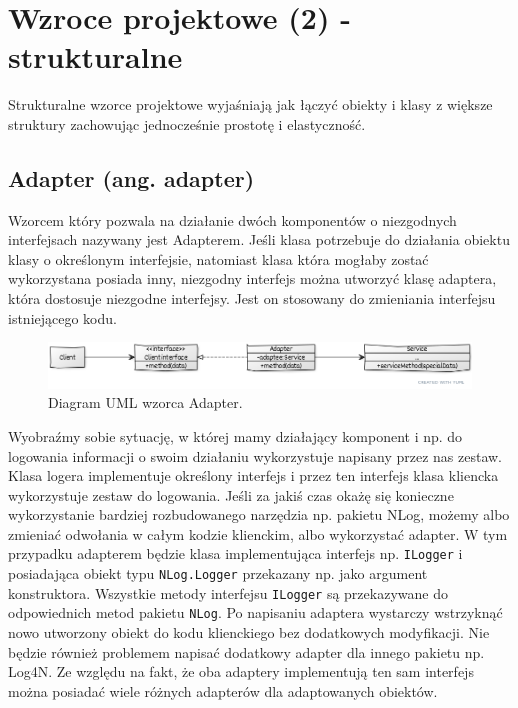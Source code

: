 \section{Wzroce projektowe (2) - strukturalne}

Strukturalne wzorce projektowe wyjaśniają jak łączyć obiekty i klasy z większe struktury zachowując jednocześnie prostotę i elastyczność.

\subsection{Adapter (ang. adapter)}

Wzorcem który pozwala na działanie dwóch komponentów o niezgodnych interfejsach nazywany jest Adapterem. Jeśli klasa potrzebuje do działania obiektu klasy o określonym interfejsie, natomiast klasa która mogłaby zostać wykorzystana posiada inny, niezgodny interfejs można utworzyć klasę adaptera, która dostosuje niezgodne interfejsy. Jest on stosowany do zmieniania interfejsu istniejącego kodu.

\begin{figure}[hbt!]
	\centering
	\includegraphics[width=0.9\linewidth]{images/AdapterUml}
	\caption{Diagram UML wzorca Adapter.}
	\label{lab3/fig/AdapterUml}
\end{figure}
%

Wyobraźmy sobie sytuację, w której mamy działający komponent i np. do logowania informacji o swoim działaniu wykorzystuje napisany przez nas zestaw. Klasa logera implementuje określony interfejs i przez ten interfejs klasa kliencka wykorzystuje zestaw do logowania. Jeśli za jakiś czas okażę się konieczne wykorzystanie bardziej rozbudowanego narzędzia np. pakietu NLog, możemy albo zmieniać odwołania w całym kodzie klienckim, albo wykorzystać adapter. W tym przypadku adapterem będzie klasa implementująca interfejs np. \texttt{ILogger} i posiadająca obiekt typu \texttt{NLog.Logger} przekazany np. jako argument konstruktora. Wszystkie metody interfejsu \texttt{ILogger} są przekazywane do odpowiednich metod pakietu \texttt{NLog}. Po napisaniu adaptera wystarczy wstrzyknąć nowo utworzony obiekt do kodu klienckiego bez dodatkowych modyfikacji. Nie będzie również problemem napisać dodatkowy adapter dla innego pakietu np. Log4N. Ze względu na fakt, że oba adaptery implementują ten sam interfejs można posiadać wiele różnych adapterów dla adaptowanych obiektów.


